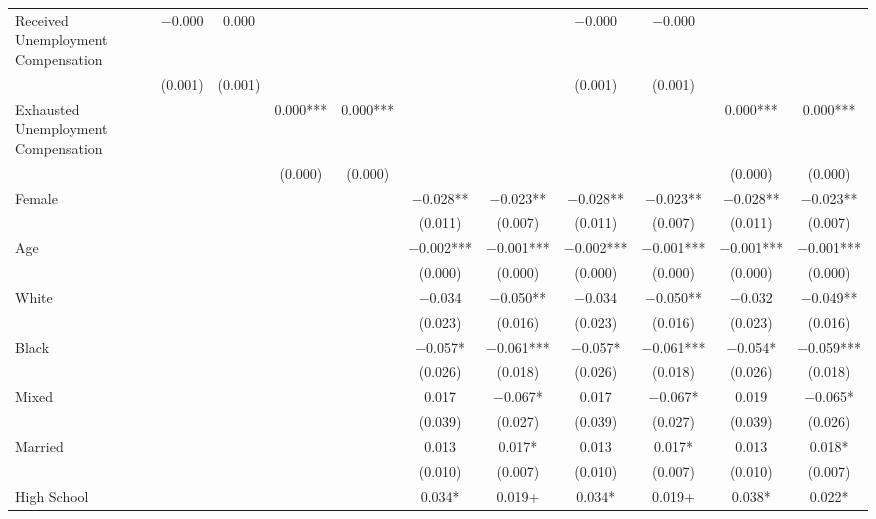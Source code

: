 \documentclass[
]{article}
\begin{document}
\begin{table}
{\begin{tabular}[t]{lcccccccccccc}
Received Unemployment Compensation &  &  & \num{-0.000} & \num{0.000} &  &  &  &  & \num{-0.000} & \num{-0.000} &  & \\
 &  &  & (\num{0.001}) & (\num{0.001}) &  &  &  &  & (\num{0.001}) & (\num{0.001}) &  & \\
Exhausted Unemployment Compensation &  &  &  &  & \num{0.000}*** & \num{0.000}*** &  &  &  &  & \num{0.000}*** & \num{0.000}***\\
 &  &  &  &  & (\num{0.000}) & (\num{0.000}) &  &  &  &  & (\num{0.000}) & (\num{0.000})\\
Female &  &  &  &  &  &  & \num{-0.028}** & \num{-0.023}** & \num{-0.028}** & \num{-0.023}** & \num{-0.028}** & \num{-0.023}**\\
 &  &  &  &  &  &  & (\num{0.011}) & (\num{0.007}) & (\num{0.011}) & (\num{0.007}) & (\num{0.011}) & (\num{0.007})\\
Age &  &  &  &  &  &  & \num{-0.002}*** & \num{-0.001}*** & \num{-0.002}*** & \num{-0.001}*** & \num{-0.001}*** & \num{-0.001}***\\
 &  &  &  &  &  &  & (\num{0.000}) & (\num{0.000}) & (\num{0.000}) & (\num{0.000}) & (\num{0.000}) & (\num{0.000})\\
White &  &  &  &  &  &  & \num{-0.034} & \num{-0.050}** & \num{-0.034} & \num{-0.050}** & \num{-0.032} & \num{-0.049}**\\
 &  &  &  &  &  &  & (\num{0.023}) & (\num{0.016}) & (\num{0.023}) & (\num{0.016}) & (\num{0.023}) & (\num{0.016})\\
Black &  &  &  &  &  &  & \num{-0.057}* & \num{-0.061}*** & \num{-0.057}* & \num{-0.061}*** & \num{-0.054}* & \num{-0.059}***\\
 &  &  &  &  &  &  & (\num{0.026}) & (\num{0.018}) & (\num{0.026}) & (\num{0.018}) & (\num{0.026}) & (\num{0.018})\\
Mixed &  &  &  &  &  &  & \num{0.017} & \num{-0.067}* & \num{0.017} & \num{-0.067}* & \num{0.019} & \num{-0.065}*\\
 &  &  &  &  &  &  & (\num{0.039}) & (\num{0.027}) & (\num{0.039}) & (\num{0.027}) & (\num{0.039}) & (\num{0.026})\\
Married &  &  &  &  &  &  & \num{0.013} & \num{0.017}* & \num{0.013} & \num{0.017}* & \num{0.013} & \num{0.018}*\\
 &  &  &  &  &  &  & (\num{0.010}) & (\num{0.007}) & (\num{0.010}) & (\num{0.007}) & (\num{0.010}) & (\num{0.007})\\
High School &  &  &  &  &  &  & \num{0.034}* & \num{0.019}+ & \num{0.034}* & \num{0.019}+ & \num{0.038}* & \num{0.022}*\\

\end{tabular}}
\end{table}
\end{document}
